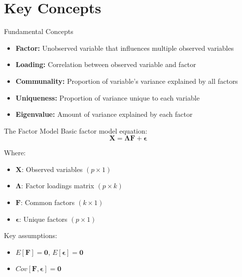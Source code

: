 \documentclass[aspectratio=169]{beamer}
\begin{document}
\section{Key Concepts}
\begin{frame}{Fundamental Concepts}
  \begin{itemize}
    \item \textbf{Factor:} Unobserved variable that influences multiple observed variables
    \item \textbf{Loading:} Correlation between observed variable and factor
    \item \textbf{Communality:} Proportion of variable's variance explained by all factors
    \item \textbf{Uniqueness:} Proportion of variance unique to each variable
    \item \textbf{Eigenvalue:} Amount of variance explained by each factor
  \end{itemize}
\end{frame}

\begin{frame}{The Factor Model}
  Basic factor model equation:
  $$\mathbf{X} = \mathbf{\Lambda F} + \mathbf{\epsilon}$$
  
  Where:
  \begin{itemize}
    \item $\mathbf{X}$: Observed variables $(p \times 1)$
    \item $\mathbf{\Lambda}$: Factor loadings matrix $(p \times k)$
    \item $\mathbf{F}$: Common factors $(k \times 1)$
    \item $\mathbf{\epsilon}$: Unique factors $(p \times 1)$
  \end{itemize}
  
  Key assumptions:
  \begin{itemize}
    \item $E[\mathbf{F}] = \mathbf{0}$, $E[\mathbf{\epsilon}] = \mathbf{0}$
    \item $Cov[\mathbf{F}, \mathbf{\epsilon}] = \mathbf{0}$
  \end{itemize}
\end{frame}
\end{document}
